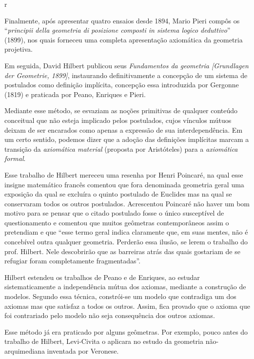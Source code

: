 r\documentclass{hipatia}
\begin{document}
Finalmente, após apresentar quatro ensaios desde 1894, Mario Pieri compôs os ``\emph{principii della geometria di posizione composti in sistema logico deduttivo}'' (1899), nos quais forneceu uma completa apresentação axiomática da geometria projetiva.  \cite[, p. 226--227]{kneebone1963} 
\cite[p. 317]{bottazzini2001}

Em seguida, David Hilbert publicou seus \emph{Fundamentos da geometria [Grundlagen der Geometrie, 1899]}, instaurando definitivamente a concepção de um sistema de postulados como definição implícita, concepção essa introduzida por Gergonne (1819) e praticada por Peano, Enriques e Pieri. 

Mediante esse método, se esvaziam as noções primitivas de qualquer conteúdo conceitual que não esteja implicado pelos postulados, cujos vínculos mútuos deixam de ser encarados como apenas a expressão de sua interdependência. Em um certo sentido, podemos dizer que a adoção das definições implícitas marcam a transição da \emph{axiomática material}  (proposta por Aristóteles)  para a \emph{axiomática formal}. \cite[p. 115]{beth1955}\cite[p. 691]{kneale}\cite[p. 201]{kneebone1963}

Esse trabalho de Hilbert mereceu uma resenha por Henri Poincaré, na qual esse insigne matemático francês comentou que fora denominada geometria geral uma exposição da qual se excluíra o quinto postulado de Euclides mas na qual se conservaram todos os outros postulados. Acrescentou Poincaré não haver um bom motivo para se pensar que o citado postulado fosse o único susceptível de questionamento e comentou que muitos geômetras contemporâneos assim o pretendiam e que ``esse termo geral indica claramente que, em suas mentes, não é concebível outra qualquer geometria. Perderão essa ilusão, se lerem o trabalho do prof. Hilbert. Nele descobrirão que as barreiras atrás das quais gostariam de se refugiar foram completamente fragmentadas''. \cite[p. 77-78]{poincare1999}

Hilbert estendeu os trabalhos de Peano e de Enriques, ao estudar sistematicamente a independência mútua dos axiomas, mediante a construção de modelos. Segundo essa técnica, constrói-se um modelo que contradiga um dos axiomas mas que satisfaz a todos os outros. Assim, fica provado que o axioma que foi contrariado pelo modelo não seja consequência dos outros axiomas.

Esse método já era praticado por alguns geômetras. Por exemplo, pouco antes do trabalho de Hilbert, Levi-Civita o aplicara no estudo da geometria não-arquimediana inventada por Veronese. 
\end{document}
